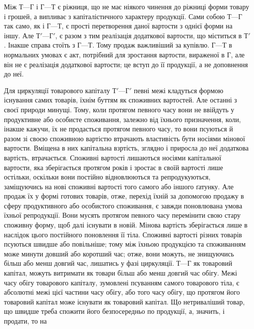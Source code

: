 Між $Т — Г$ і $Г — Т$ є ріжниця, що не має ніякого чинення до ріжниці
форми товару і грошей, а випливає з капіталістичного характеру
продукції. Сами собою $Т — Г$ так само, як і $Г — Т$, є прості перетворення
даної вартости з однієї форми на іншу. Але $Т' — Г'$, є разом з тим
реалізація додаткової вартости, що міститься в $Т'$. Інакше справа стоїть з
$Г — Т$. Тому продаж важливіший за купівлю. $Г — Т$ в нормальних умовах
є акт, потрібний для зростання вартости, вираженої в $Г$, але він не є
реалізація додаткової вартости; це вступ до її продукції, а не доповнення
до неї.

Для циркуляції товарового капіталу $Т' — Г'$ певні межі кладуться
формою існування самих товарів, їхнім буттям як споживних вартостей.
Але останні з своєї природи минущі. Тому, коли протягом певного часу
вони не ввійдуть у продуктивне або особисте споживання, залежно від
їхнього призначення, коли, інакше кажучи, їх не продасться протягом
певного часу, то вони псуються й разом зі своєю споживною вартістю
втрачають властивість бути носіями мінової вартости. Вміщена в них
капітальна взртість, зглядно і приросла до неї додаткова вартість, втрачається.
Споживні вартості лишаються носіями капітальної вартости, яка
зберігається протягом років і зростає в своїй вартості лише остільки,
оскільки вони постійно відновлюються та репродукуються, заміщуючись
на нові споживні вартості того самого або іншого ґатунку. Але продаж
їх у формі готових товарів, отже, перехід їхній за допомогою продажу
в сферу продуктивного або особистого споживання, є завжди поновлювана
умова їхньої репродукції. Вони мусять протягом певного часу
перемінити свою стару споживну форму, щоб далі існувати в новій.
Мінова вартість зберігається лише в наслідок цього постійного поновлення
її тіла. Споживні вартості різних товарів псуються швидше
або повільніше; тому між їхньою продукцією та споживанням може
минути довший або коротший час; отже, вони можуть, не знищуючись
більш або менш довгий час, лишатись у фазі циркуляції. $Т — Г$
як товаровий капітал, можуть витримати як товари більш або менш
довгий час обігу. Межі часу обігу товарового капіталу, зумовлені псуванням
самого товарового тіла, є абсолютні межі цієї частини часу обігу,
або того часу обігу, що протягом його товаровий капітал може існувати
як товаровий капітал. Що нетриваліший товар, що швидше треба
спожити його безпосередньо по продукції, а, значить, і продати, то на
\parbreak{}  %
